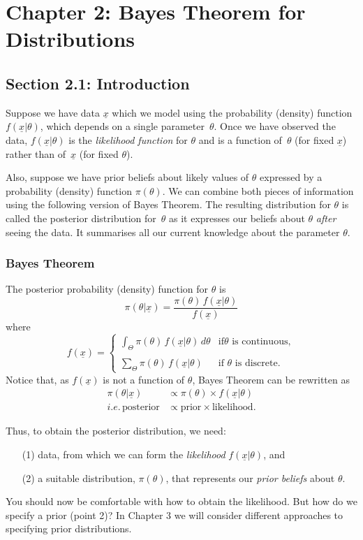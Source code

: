 \chapter{Chapter 2: Bayes Theorem for Distributions}
\section{Section 2.1: Introduction}
Suppose we have data $\underline{x}$ which we model using the probability
(density) function $f(\underline{x}|\theta)$, which depends on a single
parameter~$\theta$. Once we have observed the data, $f(\underline{x}|\theta)$
is the \textit{likelihood function} for $\theta$ and is a function
of~$\theta$ (for fixed $\underline{x}$) rather than of~$\underline{x}$ (for fixed
$\theta$).

Also, suppose we have prior beliefs about likely values of $\theta$
expressed by a probability (density) function $\pi(\theta)$. We can
combine both pieces of information using the following version of
Bayes Theorem. The resulting distribution for $\theta$ is called the
posterior distribution for~$\theta$ as it expresses our beliefs about
$\theta$ {\it after} seeing the data. It summarises all our current
knowledge about the parameter $\theta$.

\subsection*{Bayes Theorem}
The posterior probability (density) function for $\theta$ is
$$\pi(\theta|\underline{x})=\frac{\pi(\theta)\,f(\underline{x}|\theta)}{f(\underline{x})} 
$$
where
$$
f(\underline{x})=
\begin{cases}
\int_\Theta\pi(\theta)\,f(\underline{x}|\theta)\,d\theta & \text{if
$\theta$ is continuous}, \\ \\
\sum_\Theta\pi(\theta)\,f(\underline{x}|\theta) & \text{if $\theta$ is discrete}.
\end{cases} 
$$
Notice that, as $f(\underline{x})$ is not a function of
$\theta$, Bayes Theorem can be rewritten as
\begin{align*}
\pi(\theta|\underline{x})&\propto \pi(\theta)\times f(\underline{x}|\theta) \\
i.e. \, \text{posterior}&\propto\text{prior}\times\text{likelihood}.
\end{align*}



\noindent Thus, to obtain the posterior distribution, we need:
\begin{itemize}
\item [(1)] data, from which we can form the \emph{likelihood} $f(\underline{x}|\theta)$, and 
\item [(2)] a suitable distribution, $\pi(\theta)$, that represents our \emph{prior beliefs} about $\theta$.  
\end{itemize}
You should now be comfortable with how to obtain the likelihood. But how do we specify a prior (point 2)? In Chapter 3 we will consider different approaches to specifying prior distributions.

